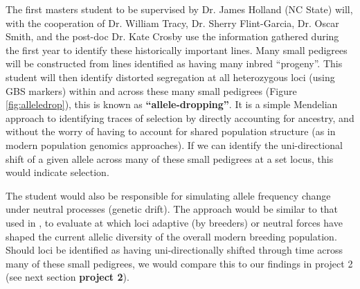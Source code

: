 \documentclass[draft,12pt]{article}
\begin{document}
The first masters student to be supervised by Dr. James Holland (NC State) will, with the cooperation of Dr. William Tracy, Dr. Sherry Flint-Garcia, Dr. Oscar Smith, and the post-doc Dr. Kate Crosby use the information gathered during the first year to identify these historically important lines. 
Many small pedigrees will be constructed from lines identified as having many inbred ``progeny''. 
This student will then identify distorted segregation at all heterozygous loci (using GBS markers) within and across these many small pedigrees (Figure \ref{fig:alleledrop}), this is known as \textbf{``allele-dropping''}. 
It is a simple Mendelian approach to identifying traces of selection by directly accounting for ancestry, and without the worry of having to account for shared population structure (as in modern population genomics approaches). 
If we can identify the uni-directional shift of a given allele across many of these small pedigrees at a set locus, this would indicate selection. 

The student would also be responsible for simulating allele frequency change under neutral processes (genetic drift). The approach would be similar to that used in \citep{Gerke:2013tw}, to evaluate at which loci adaptive (by breeders) or neutral forces have shaped the current allelic diversity of the overall modern breeding population. 
Should loci be identified as having uni-directionally shifted through time across many of these small pedigrees, we would compare this to our findings in project 2 (see next section \textbf{project 2}).
\end{document}
